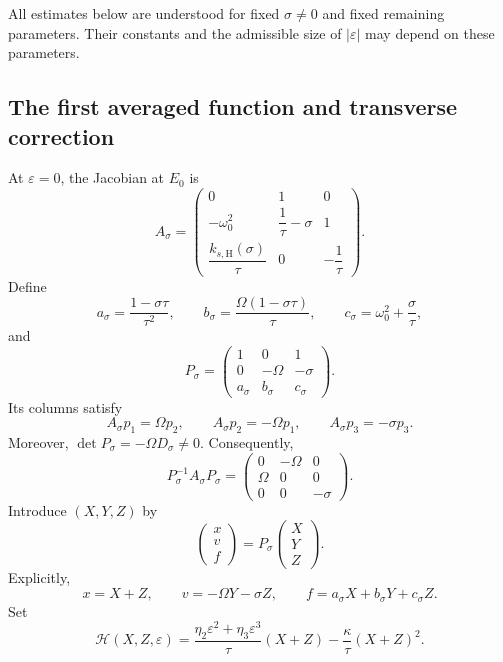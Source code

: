 \documentclass[11pt,reqno]{amsart}
\theoremstyle{plain}
\theoremstyle{definition}
\theoremstyle{remark}
\begin{document}
All estimates below are understood for fixed $\sigma\neq0$
and fixed remaining parameters. Their constants and the
admissible size of $|\varepsilon|$ may depend on these
parameters.


\subsection{The first averaged function and transverse correction}
\label{subsec:classical-first-average}
At $\varepsilon=0$, the Jacobian at $E_0$ is
\[
A_\sigma=
\begin{pmatrix}
0&1&0\\
-\omega_0^2&\dfrac1\tau-\sigma&1\\
\dfrac{k_{s,\mathrm H}(\sigma)}{\tau}&0&-\dfrac1\tau
\end{pmatrix}.
\]
Define
\[
a_\sigma=\frac{1-\sigma\tau}{\tau^2},\qquad
b_\sigma=\frac{\Omega(1-\sigma\tau)}{\tau},\qquad
c_\sigma=\omega_0^2+\frac{\sigma}{\tau},
\]
and
\[
P_\sigma=
\begin{pmatrix}
1&0&1\\
0&-\Omega&-\sigma\\
a_\sigma&b_\sigma&c_\sigma
\end{pmatrix}.
\]
Its columns satisfy
\[
A_\sigma p_1=\Omega p_2,\qquad
A_\sigma p_2=-\Omega p_1,\qquad
A_\sigma p_3=-\sigma p_3.
\]
Moreover,
$
\det P_\sigma=-\Omega D_\sigma\neq0.
$
Consequently,
\[
P_\sigma^{-1}A_\sigma P_\sigma
=
\begin{pmatrix}
0&-\Omega&0\\
\Omega&0&0\\
0&0&-\sigma
\end{pmatrix}.
\]
Introduce $(X,Y,Z)$ by
\[
\begin{pmatrix}x\\v\\f\end{pmatrix}
=
P_\sigma
\begin{pmatrix}X\\Y\\Z\end{pmatrix}.
\]
Explicitly,
\[
x=X+Z,\qquad
v=-\Omega Y-\sigma Z,\qquad
f=a_\sigma X+b_\sigma Y+c_\sigma Z.
\]
Set
\begin{equation}
\label{eq:H-classical}
\mathcal H(X,Z,\varepsilon)
=
\frac{\eta_2\varepsilon^2+\eta_3\varepsilon^3}{\tau}(X+Z)
-\frac{\kappa}{\tau}(X+Z)^2.
\end{equation}
\end{document}

